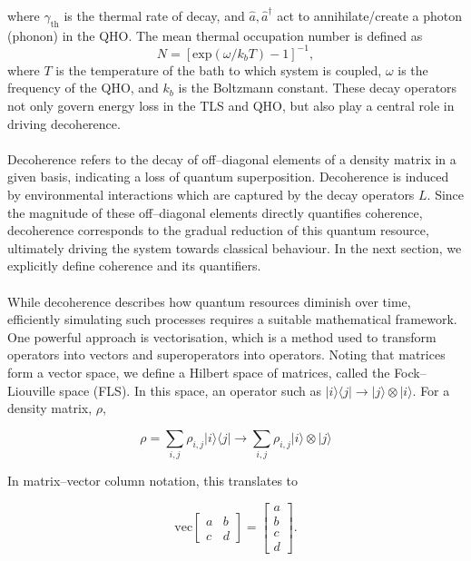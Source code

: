\documentclass[11pt]{article}
\begin{document}
where $\gamma_{\scriptscriptstyle \text{th}}$ is the thermal rate of decay, and $\hat{a},\hat{a}^\dagger$ act to annihilate/create a photon (phonon) in the QHO. 
The mean thermal occupation number is defined as 
\begin{equation} \label{therm_occ_num}
    N = [\text{exp}(\omega/k_bT) -1]^{-1},
\end{equation}
where $T$ is the temperature of the bath to which system is coupled, $\omega$ is the frequency of the QHO, and $k_b$ is the Boltzmann constant. These decay operators not only govern energy loss in the TLS and QHO, but also play a central role in driving decoherence.\\
\\
Decoherence refers to the decay of off--diagonal elements of a density matrix in a given basis, indicating a loss of quantum superposition. Decoherence is induced by environmental interactions which are captured by the decay operators $L$. Since the magnitude of these off–diagonal elements directly quantifies coherence, decoherence corresponds to the gradual reduction of this quantum resource, ultimately driving the system towards classical behaviour. In the next section, we explicitly define coherence and its quantifiers. \\
\\
While decoherence describes how quantum resources diminish over time, efficiently simulating such processes requires a suitable mathematical framework. One powerful approach is vectorisation, which is a method used to transform operators into vectors and superoperators into operators. Noting that matrices form a vector space, we define a Hilbert space of matrices, called the Fock--Liouville space (FLS). In this space, an operator such as $|i\rangle\langle j| \rightarrow |j\rangle \otimes |i\rangle$. For a density matrix, $\rho$, 

\begin{equation*}
    \rho = \sum_{i,j}\rho_{i,j}|i\rangle\langle j| \rightarrow \sum_{i,j}\rho_{i,j}|i\rangle\otimes |j\rangle
\end{equation*}

In matrix--vector column notation, this translates to 

\begin{equation*}
    \text{vec}\begin{bmatrix}
        a & b \\
        c & d
    \end{bmatrix}
    = \begin{bmatrix}
        a\\
        b\\
        c\\
        d
    \end{bmatrix}.
\end{equation*}
\end{document}
